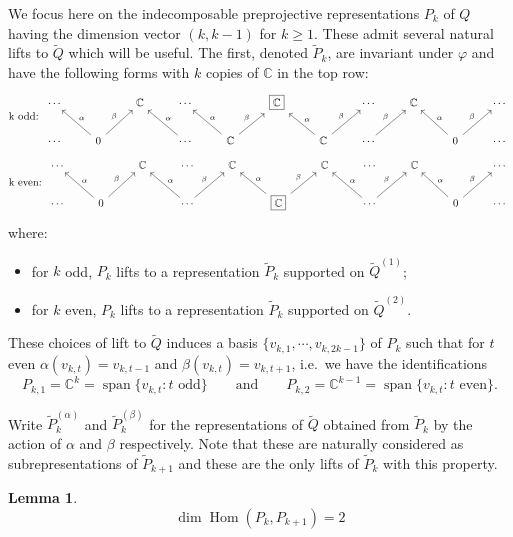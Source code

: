 \documentclass{amsart}
\newtheorem{lemma}[theorem]{Lemma}
\numberwithin{equation}{section}
\newcommand{\CC}{\mathbb{C}}
\newcommand{\Hom}{\operatorname{Hom}}
\newcommand{\Span}{\operatorname{span}}
\begin{document}
  We focus here on the indecomposable preprojective representations $P_k$ of $Q$ having the dimension vector $(k,k-1)$ for $k\ge1$.
  These admit several natural lifts to $\widetilde Q$ which will be useful.
  The first, denoted $\widetilde P_k$, are invariant under $\varphi$ and have the following forms with $k$ copies of $\CC$ in the top row:
  \[
    \text{k odd: }
    \begin{tikzcd}
      \cdots & & \CC & \cdots & & \fbox{$\CC$} & & \cdots & \CC & & \cdots \\
      \cdots & 0 \arrow["\alpha"']{ul} \arrow["\beta"]{ur} & & \cdots \arrow["\alpha"']{ul} & \CC \arrow["\alpha"']{ul} \arrow["\beta"]{ur} & & \CC \arrow["\alpha"']{ul} \arrow["\beta"]{ur} & \cdots \arrow["\beta"]{ur} & & 0 \arrow["\alpha"']{ul} \arrow["\beta"]{ur} & \cdots
    \end{tikzcd}
  \]
  \[
    \text{k even: }
    \begin{tikzcd}
      \cdots & & \CC & \cdots & \CC & & \CC & \cdots & \CC & & \cdots \\
      \cdots & 0 \arrow["\alpha"']{ul} \arrow["\beta"]{ur} & & \cdots \arrow["\alpha"']{ul} \arrow["\beta"]{ur} & & \fbox{$\CC$} \arrow["\alpha"']{ul} \arrow["\beta"]{ur} & & \cdots \arrow["\alpha"']{ul} \arrow["\beta"]{ur} & & 0 \arrow["\alpha"']{ul} \arrow["\beta"]{ur} & \cdots
    \end{tikzcd}
  \]
  where:
  \begin{itemize}
    \item for $k$ odd, $P_k$ lifts to a representation $\widetilde P_k$ supported on $\widetilde Q^{(1)}$;
    \item for $k$ even, $P_k$ lifts to a representation $\widetilde P_k$ supported on $\widetilde Q^{(2)}$.
  \end{itemize}

  These choices of lift to $\widetilde Q$ induces a basis $\{v_{k,1},\cdots,v_{k,2k-1}\}$ of $P_k$ such that for $t$ even $\alpha(v_{k,t})=v_{k,t-1}$ and $\beta(v_{k,t})=v_{k,t+1}$, i.e.\ we have the identifications
  \[P_{k,1}=\CC^k=\Span\{v_{k,t}:\text{$t$ odd}\}\qquad\text{and}\qquad P_{k,2}=\CC^{k-1}=\Span\{v_{k,t}:\text{$t$ even}\}.\]

  Write $\widetilde P_k^{(\alpha)}$ and $\widetilde P_k^{(\beta)}$ for the representations of $\widetilde Q$ obtained from $\widetilde P_k$ by the action of $\alpha$ and $\beta$ respectively.
  Note that these are naturally considered as subrepresentations of $\widetilde P_{k+1}$ and these are the only lifts of $\widetilde P_k$ with this property.
  \begin{lemma}
    \[\dim\Hom(P_k,P_{k+1})=2\]
  \end{lemma}
\end{document}
